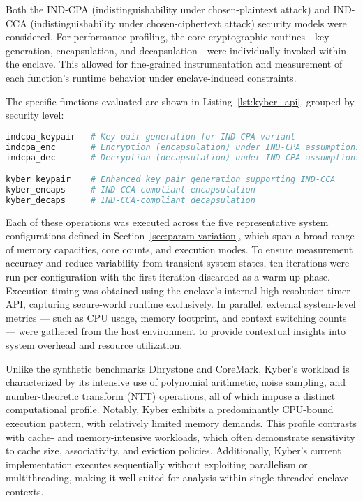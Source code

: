 Both the IND-CPA (indistinguishability under chosen-plaintext attack) and IND-CCA (indistinguishability under chosen-ciphertext attack) security models were considered. For performance profiling, the core cryptographic routines—key generation, encapsulation, and decapsulation—were individually invoked within the enclave. This allowed for fine-grained instrumentation and measurement of each function’s runtime behavior under enclave-induced constraints.

The specific functions evaluated are shown in Listing~\ref{lst:kyber_api}, grouped by security level:

\begin{lstlisting}[language=bash,caption={Kyber cryptographic API functions},label={lst:kyber_api}]
indcpa_keypair   # Key pair generation for IND-CPA variant
indcpa_enc       # Encryption (encapsulation) under IND-CPA assumptions
indcpa_dec       # Decryption (decapsulation) under IND-CPA assumptions

kyber_keypair    # Enhanced key pair generation supporting IND-CCA
kyber_encaps     # IND-CCA-compliant encapsulation
kyber_decaps     # IND-CCA-compliant decapsulation
\end{lstlisting}
Each of these operations was executed across the five representative system configurations defined in Section~\ref{sec:param-variation}, which span a broad range of memory capacities, core counts, and execution modes. To ensure measurement accuracy and reduce variability from transient system states, ten iterations were run per configuration with the first iteration discarded as a warm-up phase. Execution timing was obtained using the enclave’s internal high-resolution timer API, capturing secure-world runtime exclusively. In parallel, external system-level metrics — such as CPU usage, memory footprint, and context switching counts — were gathered from the host environment to provide contextual insights into system overhead and resource utilization.

Unlike the synthetic benchmarks Dhrystone and CoreMark, Kyber’s workload is characterized by its intensive use of polynomial arithmetic, noise sampling, and number-theoretic transform (NTT) operations, all of which impose a distinct computational profile. Notably, Kyber exhibits a predominantly CPU-bound execution pattern, with relatively limited memory demands. This profile contrasts with cache- and memory-intensive workloads, which often demonstrate sensitivity to cache size, associativity, and eviction policies. Additionally, Kyber’s current implementation executes sequentially without exploiting parallelism or multithreading, making it well-suited for analysis within single-threaded enclave contexts.


